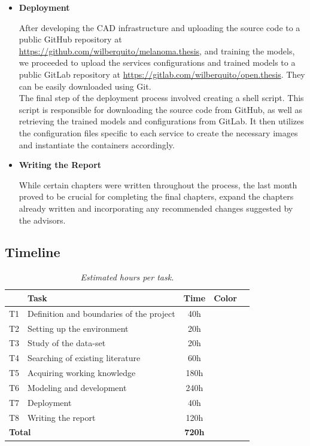 \begin{itemize}
  \item{\textbf{Deployment}}

    After developing the CAD infrastructure and uploading the source code to a
    public GitHub repository at
    \url{https://github.com/wilberquito/melanoma.thesis}, and training the
    models, we proceeded to upload the services configurations and trained
    models to a public GitLab repository at
    \url{https://gitlab.com/wilberquito/open.thesis}. They can be easily
    downloaded using Git. \\

    The final step of the deployment process involved creating a shell script.
    This script is responsible for downloading the source code from GitHub, as
    well as retrieving the trained models and configurations from GitLab. It
    then utilizes the configuration files specific to each service to create
    the necessary images and instantiate the containers accordingly.

  \item{\textbf{Writing the Report}}

    While certain chapters were written throughout the process, the last month
    proved to be crucial for completing the final chapters, expand the chapters
    already written and incorporating any recommended changes suggested by the
    advisors.

\end{itemize}

\newpage

\subsection{Timeline}

\begin{table}[H] \centering
  \begin{tabular}{| l | l | c | c | c |}
    \hline
    \textbf{} & \textbf{Task} & \textbf{Time} & \textbf{Color} \\ \hline
    T1 &    Definition and boundaries of the project & 40h & \cellcolor{red!50} \\ \hline
    T2 &    Setting up the environment & 20h & \cellcolor{lime!50} \\ \hline
    T3 &    Study of the data-set & 20h & \cellcolor{blue!40} \\ \hline
    T4 &    Searching of existing literature & 60h & \cellcolor{teal!50} \\ \hline
    T5 &    Acquiring working knowledge & 180h & \cellcolor{amber!30} \\ \hline
    T6 &    Modeling and development & 240h & \cellcolor{black!70} \\ \hline
    T7 &    Deployment & 40h & \cellcolor{gray!50} \\ \hline
    T8 &    Writing the report & 120h & \cellcolor{orange!50} \\ \hline
    \multicolumn{2}{|l|}{\textbf{Total}} & \textbf{720h} & \\ \hline
  \end{tabular}
  \caption[Estimated hours per task]{\textit{Estimated hours per task. }}
  {\label{table:timeline_tasks}}
\end{table}

